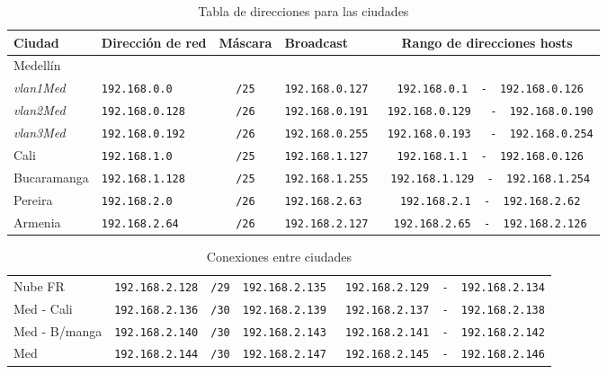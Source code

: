 \begin{center}
\begin{table*}[htpd]
\hfill{}
\begin{tabular}{l lclc}
Ciudad & Dirección de red & Máscara &  Broadcast & Rango de direcciones hosts\\ \hline
Medellín & & & \\
{\em vlan1Med} & 	\verb=192.168.0.0= &	\verb=/25= & \verb=192.168.0.127= & 	\verb= 192.168.0.1  -  192.168.0.126= \\
{\em vlan2Med} &	\verb=192.168.0.128= & 	\verb=/26= & \verb=192.168.0.191= & 	\verb= 192.168.0.129   -  192.168.0.190= \\
{\em vlan3Med} &	\verb=192.168.0.192= & 	\verb=/26= & \verb=192.168.0.255= & 	\verb= 192.168.0.193   -  192.168.0.254= \\
Cali & 		\verb=192.168.1.0= & 	\verb=/25= & \verb=192.168.1.127= & 	\verb= 192.168.1.1  -  192.168.0.126= \\
Bucaramanga &\verb=192.168.1.128=&	\verb=/25= & \verb=192.168.1.255= &	\verb= 192.168.1.129  -  192.168.1.254= \\
Pereira &  	\verb=192.168.2.0= & 	\verb=/26= & \verb=192.168.2.63= & 	\verb= 192.168.2.1  -  192.168.2.62= \\
Armenia &	\verb=192.168.2.64= & 	\verb=/26= & \verb=192.168.2.127= & 	\verb= 192.168.2.65  -  192.168.2.126= \\
\end{tabular}
\hfill{}
\caption{Tabla de direcciones para las ciudades}
\end{table*}
\end{center}

\begin{center}
\begin{table*}[htdp]
\hfill{}
\begin{tabular}{l lclc}
Nube FR & 	\verb=192.168.2.128= &	\verb=/29= & \verb=192.168.2.135= & 	\verb= 192.168.2.129  -  192.168.2.134= \\
Med - Cali &	\verb=192.168.2.136= & 	\verb=/30= & \verb=192.168.2.139= & 	\verb= 192.168.2.137  -  192.168.2.138= \\
Med - B/manga &\verb=192.168.2.140= & \verb=/30= & \verb=192.168.2.143= & 	\verb= 192.168.2.141  -  192.168.2.142= \\
Med &		\verb=192.168.2.144=&	\verb=/30= & \verb=192.168.2.147= &	\verb= 192.168.2.145  -  192.168.2.146= \\
\end{tabular}
\hfill{}
\caption{Conexiones entre ciudades}
\end{table*}
\end{center}
